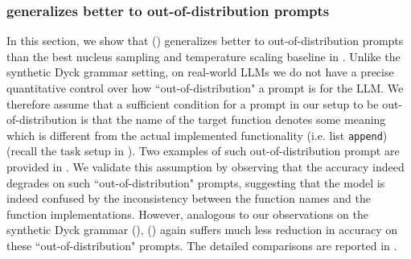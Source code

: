 \clearpage
\subsubsection{\algoName generalizes better to out-of-distribution prompts}
\label{sec:experiments:codellama:ood}

In this section, we show that 
\algoName ()
generalizes better to out-of-distribution prompts
than the best nucleus sampling and temperature scaling baseline in .
Unlike the synthetic Dyck grammar setting,
on real-world LLMs we do not have a precise quantitative control over how ``out-of-distribution" a prompt is for the LLM.
We therefore assume that a sufficient condition for a prompt in our setup to be out-of-distribution is that
the name of the target function denotes some meaning which is different from
the actual implemented functionality
(i.e. list \texttt{append}) 
(recall the task setup in ).
Two examples of such out-of-distribution prompt are provided in .
We validate this assumption by observing that the accuracy indeed degrades on such ``out-of-distribution" prompts,
suggesting that the model is indeed confused by the inconsistency between the function names and the function implementations.
However, analogous to our observations on the synthetic Dyck grammar (),
\algoName () again suffers much less reduction in accuracy on these ``out-of-distribution" prompts.
The detailed comparisons are reported in . 




